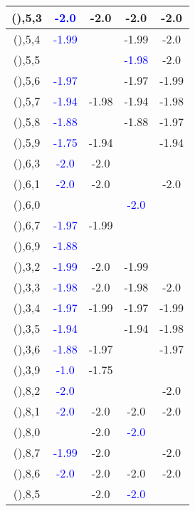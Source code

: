 \documentclass{article}
\begin{document}
\begin{center}
\begin{longtable}{|c|c|c|c|c|}
        	(),5,3& \textcolor{blue}{-2.0}&-2.0&-2.0&-2.0\\
        	\hline
        	(),5,4& \textcolor{blue}{-1.99}&&-1.99&-2.0\\
        	\hline
        	(),5,5&&& \textcolor{blue}{-1.98}&-2.0\\
        	\hline
        	(),5,6& \textcolor{blue}{-1.97}&&-1.97&-1.99\\
        	\hline
        	(),5,7& \textcolor{blue}{-1.94}&-1.98&-1.94&-1.98\\
        	\hline
        	(),5,8& \textcolor{blue}{-1.88}&&-1.88&-1.97\\
        	\hline
        	(),5,9& \textcolor{blue}{-1.75}&-1.94&&-1.94\\
        	\hline
        	(),6,3& \textcolor{blue}{-2.0}&-2.0&&\\
        	\hline
        	(),6,1& \textcolor{blue}{-2.0}&-2.0&&-2.0\\
        	\hline
        	(),6,0&&& \textcolor{blue}{-2.0}&\\
        	\hline
        	(),6,7& \textcolor{blue}{-1.97}&-1.99&&\\
        	\hline
        	(),6,9& \textcolor{blue}{-1.88}&&&\\
        	\hline
        	(),3,2& \textcolor{blue}{-1.99}&-2.0&-1.99&\\
        	\hline
        	(),3,3& \textcolor{blue}{-1.98}&-2.0&-1.98&-2.0\\
        	\hline
        	(),3,4& \textcolor{blue}{-1.97}&-1.99&-1.97&-1.99\\
        	\hline
        	(),3,5& \textcolor{blue}{-1.94}&&-1.94&-1.98\\
        	\hline
        	(),3,6& \textcolor{blue}{-1.88}&-1.97&&-1.97\\
        	\hline
        	(),3,9& \textcolor{blue}{-1.0}&-1.75&&\\
        	\hline
        	(),8,2& \textcolor{blue}{-2.0}&&&-2.0\\
        	\hline
        	(),8,1& \textcolor{blue}{-2.0}&-2.0&-2.0&-2.0\\
        	\hline
        	(),8,0&&-2.0& \textcolor{blue}{-2.0}&\\
        	\hline
        	(),8,7& \textcolor{blue}{-1.99}&-2.0&&-2.0\\
        	\hline
        	(),8,6& \textcolor{blue}{-2.0}&-2.0&-2.0&-2.0\\
        	\hline
        	(),8,5&&-2.0& \textcolor{blue}{-2.0}&\\

\end{longtable}
\end{center}
\end{document}
